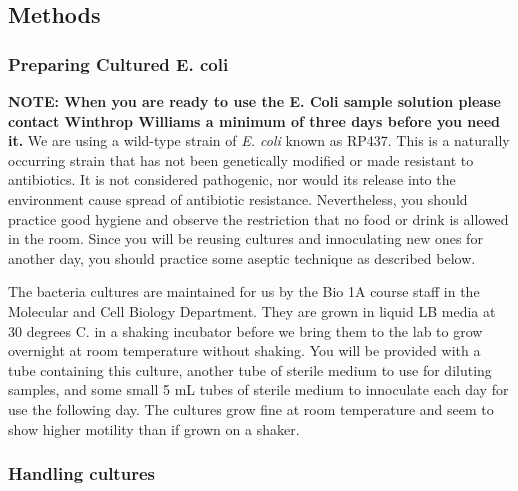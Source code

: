 \documentclass{../lab}
\begin{document}


\subsection{Methods}

\subsubsection{Preparing Cultured E. coli}

\textbf{NOTE: When you are ready to use the E. Coli sample solution please contact Winthrop Williams a minimum of three days before you need it.} We are using a wild-type strain of \emph{E. coli} known as RP437. This is a naturally occurring strain that has not been genetically modified or made resistant to antibiotics. It is not considered pathogenic, nor would its release into the environment cause spread of antibiotic resistance. Nevertheless, you should practice good hygiene and observe the restriction that no food or drink is allowed in the room. Since you will be reusing cultures and innoculating new ones for another day, you should practice some aseptic technique as described below.

The bacteria cultures are maintained for us by the Bio 1A course staff in the Molecular and Cell Biology Department. They are grown in liquid LB media at 30 degrees C. in a shaking incubator before we bring them to the lab to grow overnight at room temperature without shaking. You will be provided with a tube containing this culture, another tube of sterile medium to use for diluting samples, and some small 5 mL tubes of sterile medium to innoculate each day for use the following day. The cultures grow fine at room temperature and seem to show higher motility than if grown on a shaker.

\subsubsection{Handling cultures}
\end{document}
